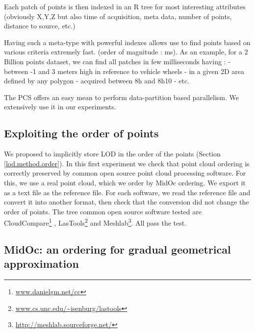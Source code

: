 		Each patch of points is then indexed in an R tree for most interesting attributes (obviously X,Y,Z but also time of acquisition, meta data, number of points, distance to source, etc.)
			
		Having such a meta-type with powerful indexes allows use to find points based on various criteria extremely fast. (order of magnitude : ms). 
		As an example, for a 2 Billion points dataset, we can find all patches in few milliseconds having : 
		 - between -1 and 3 meters high in reference to vehicle wheels
		 - in a given 2D area defined by any polygon 
		 - acquired between 8h and 8h10 - etc.
		 
		The PCS offers an easy mean to perform data-partition based parallelism. We extensively use it in our experiments. 


	\subsection{Exploiting the order of points}
		\label{lod.result.os_softwares}
		We proposed to implicitly store LOD in the order of the points (Section \ref{lod.method.order}).
		In this first experiment we check that point cloud ordering is correctly preserved by common open source point cloud processing software.
		For this, we use a real point cloud, which we order by MidOc ordering. 
		We export it as a text file as the reference file.
		For each software, we read the reference file and convert it into another format, then check that the conversion did not change the order of points. 
		The tree common open source software tested are CloudCompare\footnote{\url{www.danielgm.net/cc}}
		, LasTools\footnote{\url{www.cs.unc.edu/~isenburg/lastools}} and Meshlab\footnote{\url{http://meshlab.sourceforge.net/}}.
		All pass the test.
			
	\subsection{MidOc: an ordering for gradual geometrical approximation}
		
